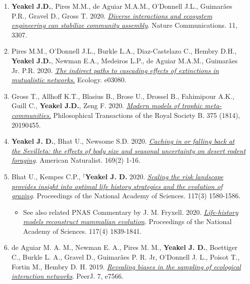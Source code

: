 \documentclass[margin,line,12pt]{res}
\begin{document}
\begin{resume}
\begin{enumerate}
\item \textbf{Yeakel J.D.}, Pires M.M., de Aguiar M.A.M., O'Donnell J.L., Guimar\~aes P.R., Gravel D., Gross T. 2020. \href{https://www.nature.com/articles/s41467-020-17164-x}{\emph{Diverse interactions and ecosystem engineering can stabilize community assembly}}. Nature Communications. 11, 3307.

\item Pires M.M., O'Donnell J.L., Burkle L.A., Diaz-Castelazo C., Hembry D.H., \textbf{Yeakel J.D.}, Newman E.A., Medeiros L.P., de Aguiar M.A.M., Guimar\~aes Jr. P.R. 2020. \href{https://esajournals.onlinelibrary.wiley.com/doi/pdf/10.1002/ecy.3080}{\emph{The indirect paths to cascading effects of extinctions in mutualistic networks.}} Ecology. e03080.

\item Gross T., Allhoff K.T., Blasius B., Brose U., Drossel B., Fahimipour A.K., Guill C., \textbf{Yeakel J.D.}, Zeng F. 2020. \href{https://royalsocietypublishing.org/doi/pdf/10.1098/rstb.2019.0455}{\emph{Modern models of trophic meta-communities.}} Philosophical Transactions of the Royal Society B. 375 (1814), 20190455.

\item \textbf{Yeakel J. D.}, Bhat U., Newsome S.D. 2020. \href{https://www.journals.uchicago.edu/doi/10.1086/709019}{\emph{Caching in or falling back at the Sevilleta: the effects of body size and seasonal uncertainty on desert rodent foraging}}. American Naturalist. 169(2) 1-16.

\item Bhat U., Kempes C.P., \textbf{${}^\dag$Yeakel J. D.} 2020. \href{https://doi.org/10.1073/pnas.1907998117}{\emph{Scaling the risk landscape provides insight into optimal life history strategies and the evolution of grazing}}. Proceedings of the National Academy of Sciences.  117(3) 1580-1586.
  {\footnotesize
	\begin{itemize}
		\item See also related PNAS Commentary by J. M. Fryxell. 2020. \href{https://www.pnas.org/content/117/4/1839}{\emph{Life-history models reconstruct mammalian evolution}}. Proceedings of the National Academy of Sciences. 117(4) 1839-1841.
	\end{itemize}
  }
\item de Aguiar M. A. M., Newman E. A., Pires M. M., \textbf{Yeakel J. D.}, Boettiger C., Burkle L. A., Gravel D., Guimar\~aes P. R. Jr, O’Donnell J. L., Poisot T., Fortin M., Hembry D. H. 2019. \href{https://peerj.com/articles/7566/}{\emph{Revealing biases in the sampling of ecological interaction networks}}. PeerJ. 7, e7566.


\end{enumerate}
\end{resume}
\end{document}
